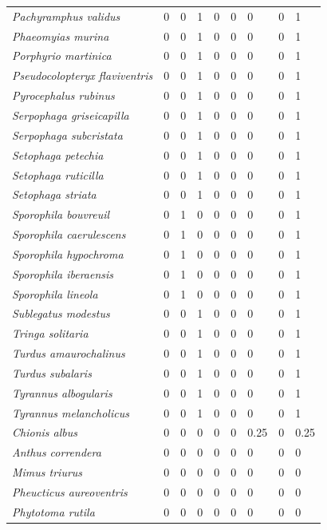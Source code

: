 \documentclass[
  oneside]{scrbook}
\begin{document}
\begin{longtable}[t]{>{}lrrrrrlrl}
\addlinespace
\em{Pachyramphus validus} & 0 & 0 & 1 & 0 & 0 & 0 & 0 & 1\\
\em{Phaeomyias murina} & 0 & 0 & 1 & 0 & 0 & 0 & 0 & 1\\
\em{Porphyrio martinica} & 0 & 0 & 1 & 0 & 0 & 0 & 0 & 1\\
\em{Pseudocolopteryx flaviventris} & 0 & 0 & 1 & 0 & 0 & 0 & 0 & 1\\
\em{Pyrocephalus rubinus} & 0 & 0 & 1 & 0 & 0 & 0 & 0 & 1\\
\addlinespace
\em{Serpophaga griseicapilla} & 0 & 0 & 1 & 0 & 0 & 0 & 0 & 1\\
\em{Serpophaga subcristata} & 0 & 0 & 1 & 0 & 0 & 0 & 0 & 1\\
\em{Setophaga petechia} & 0 & 0 & 1 & 0 & 0 & 0 & 0 & 1\\
\em{Setophaga ruticilla} & 0 & 0 & 1 & 0 & 0 & 0 & 0 & 1\\
\em{Setophaga striata} & 0 & 0 & 1 & 0 & 0 & 0 & 0 & 1\\
\addlinespace
\em{Sporophila bouvreuil} & 0 & 1 & 0 & 0 & 0 & 0 & 0 & 1\\
\em{Sporophila caerulescens} & 0 & 1 & 0 & 0 & 0 & 0 & 0 & 1\\
\em{Sporophila hypochroma} & 0 & 1 & 0 & 0 & 0 & 0 & 0 & 1\\
\em{Sporophila iberaensis} & 0 & 1 & 0 & 0 & 0 & 0 & 0 & 1\\
\em{Sporophila lineola} & 0 & 1 & 0 & 0 & 0 & 0 & 0 & 1\\
\addlinespace
\em{Sublegatus modestus} & 0 & 0 & 1 & 0 & 0 & 0 & 0 & 1\\
\em{Tringa solitaria} & 0 & 0 & 1 & 0 & 0 & 0 & 0 & 1\\
\em{Turdus amaurochalinus} & 0 & 0 & 1 & 0 & 0 & 0 & 0 & 1\\
\em{Turdus subalaris} & 0 & 0 & 1 & 0 & 0 & 0 & 0 & 1\\
\em{Tyrannus albogularis} & 0 & 0 & 1 & 0 & 0 & 0 & 0 & 1\\
\addlinespace
\em{Tyrannus melancholicus} & 0 & 0 & 1 & 0 & 0 & 0 & 0 & 1\\
\em{Chionis albus} & 0 & 0 & 0 & 0 & 0 & 0.25 & 0 & 0.25\\
\em{Anthus correndera} & 0 & 0 & 0 & 0 & 0 & 0 & 0 & 0\\
\em{Mimus triurus} & 0 & 0 & 0 & 0 & 0 & 0 & 0 & 0\\
\em{Pheucticus aureoventris} & 0 & 0 & 0 & 0 & 0 & 0 & 0 & 0\\
\addlinespace
\em{Phytotoma rutila} & 0 & 0 & 0 & 0 & 0 & 0 & 0 & 0\\*
\end{longtable}
\end{document}
